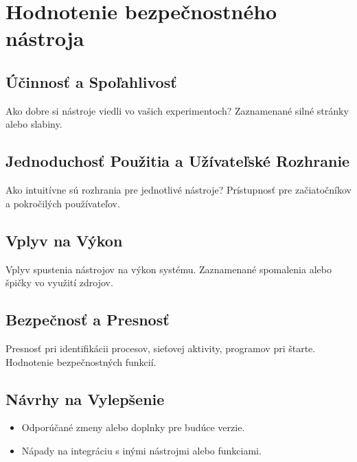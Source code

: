 \documentclass[conference]{IEEEtran}
\begin{document}
\section{Hodnotenie bezpečnostného nástroja}
\subsection{Účinnosť a Spoľahlivosť}
Ako dobre si nástroje viedli vo vašich experimentoch? Zaznamenané silné stránky alebo slabiny.

\subsection{Jednoduchosť Použitia a Užívateľské Rozhranie}
Ako intuitívne sú rozhrania pre jednotlivé nástroje? Prístupnosť pre začiatočníkov a pokročilých používateľov.

\subsection{Vplyv na Výkon}
Vplyv spustenia nástrojov na výkon systému. Zaznamenané spomalenia alebo špičky vo využití zdrojov.

\subsection{Bezpečnosť a Presnosť}
Presnosť pri identifikácii procesov, sieťovej aktivity, programov pri štarte. Hodnotenie bezpečnostných funkcií.

\subsection{Návrhy na Vylepšenie}
\begin{itemize}
    \item Odporúčané zmeny alebo doplnky pre budúce verzie.
    \item Nápady na integráciu s inými nástrojmi alebo funkciami.
\end{itemize}



\end{document}
